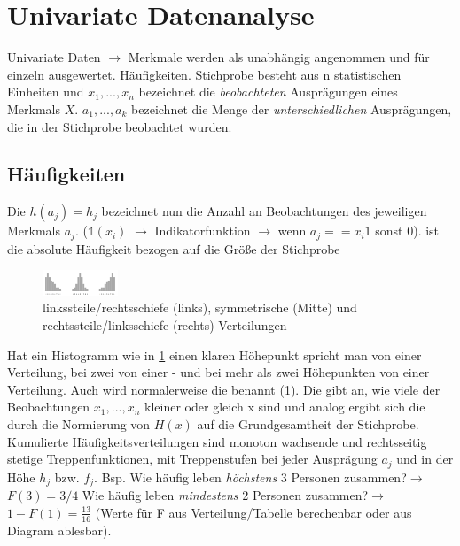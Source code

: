 \section{Univariate Datenanalyse}
Univariate Daten $\rightarrow$ Merkmale werden als unabhängig angenommen und für einzeln ausgewertet. Häufigkeiten. Stichprobe besteht aus n statistischen Einheiten und $x_1, ..., x_n$ bezeichnet die \emph{beobachteten} Ausprägungen eines Merkmals $X$. $a_1, ..., a_k$ bezeichnet die Menge der \emph{unterschiedlichen} Ausprägungen, die in der Stichprobe beobachtet wurden.
\subsection{Häufigkeiten}
Die  $h(a_j) = h_j$ bezeichnet nun die Anzahl an Beobachtungen des jeweiligen Merkmals $a_j$.  ($\mathds{1}(x_i)$ $\rightarrow$ Indikatorfunktion $\rightarrow$ wenn $a_j == x_i 1$ sonst $0$).  ist die absolute Häufigkeit bezogen auf die Größe der Stichprobe  
\begin{figure}
    \centering
    \includegraphics[width=0.2\textwidth]{images/2.3_histogramme_schiefheit.png}
    \caption{linkssteile/rechtsschiefe (links), symmetrische (Mitte) und rechtssteile/linksschiefe
    (rechts) Verteilungen}
    \vspace{-12mm}
    \label{fig:schiefheit}
\end{figure}
Hat ein Histogramm wie in \cref{fig:schiefheit} einen klaren Höhepunkt spricht man von einer  Verteilung, bei zwei von einer - und bei mehr als zwei Höhepunkten von einer  Verteilung. Auch wird normalerweise die  benannt (\cref{fig:schiefheit}).
Die  gibt an, wie viele der Beobachtungen $x_1, ..., x_n$ kleiner oder gleich x sind und analog ergibt sich die   durch die Normierung von $H(x)$ auf die Grundgesamtheit der Stichprobe. Kumulierte Häufigkeitsverteilungen sind monoton wachsende und rechtsseitig stetige Treppenfunktionen, mit Treppenstufen bei jeder Ausprägung $a_j$ und in der Höhe $h_j$ bzw. $f_j$. Bsp. \glqq Wie häufig leben \emph{höchstens} 3 Personen zusammen?\grqq $\rightarrow$ $F(3) = 3/4$  \glqq Wie häufig leben \emph{mindestens} 2 Personen zusammen?\grqq $\rightarrow$ $1 - F(1) = \frac{13}{16}$ (Werte für F aus Verteilung/Tabelle berechenbar oder aus Diagram ablesbar).
\\\\ 
